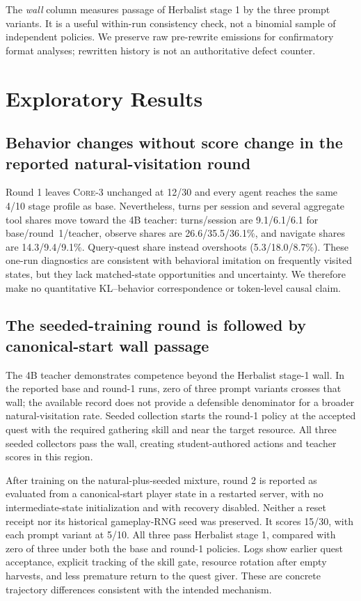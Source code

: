 \documentclass[11pt,a4paper]{article}
\newcommand{\core}{\textsc{Core-3}}
\begin{document}
The \emph{wall} column measures passage of Herbalist stage 1 by the three prompt
variants. It is a useful within-run consistency check, not a binomial sample of
independent policies. We preserve raw pre-rewrite emissions for confirmatory
format analyses; rewritten history is not an authoritative defect counter.

\section{Exploratory Results}

\subsection{Behavior changes without score change in the reported
natural-visitation round}

Round 1 leaves \core{} unchanged at 12/30 and every agent reaches the same 4/10
stage profile as base. Nevertheless, turns per session and several aggregate
tool shares move toward the 4B teacher: turns/session are
9.1/6.1/6.1 for base/round~1/teacher, observe shares are
26.6/35.5/36.1\%, and navigate shares are 14.3/9.4/9.1\%. Query-quest share
instead overshoots (5.3/18.0/8.7\%). These one-run diagnostics are consistent
with behavioral imitation on frequently visited states, but they lack
matched-state opportunities and uncertainty. We therefore make no quantitative
KL--behavior correspondence or token-level causal claim.

\subsection{The seeded-training round is followed by canonical-start wall passage}

The 4B teacher demonstrates competence beyond the Herbalist stage-1 wall. In the
reported base and round-1 runs, zero of three prompt variants crosses that wall;
the available record does not provide a defensible denominator for a broader
natural-visitation rate. Seeded collection
starts the round-1 policy at the accepted quest with the required gathering
skill and near the target resource. All three seeded collectors pass the wall,
creating student-authored actions and teacher scores in this region.

After training on the natural-plus-seeded mixture, round 2 is reported as
evaluated from a canonical-start player state in a restarted server, with no
intermediate-state initialization and with recovery disabled. Neither a reset
receipt nor its historical gameplay-RNG seed was preserved. It scores 15/30, with each prompt
variant at 5/10. All three pass Herbalist stage 1, compared with zero of three
under both the base and round-1 policies. Logs show earlier quest acceptance,
explicit tracking of the skill gate, resource rotation after empty harvests,
and less premature return to the quest giver. These are concrete trajectory
differences consistent with the intended mechanism.
\end{document}

